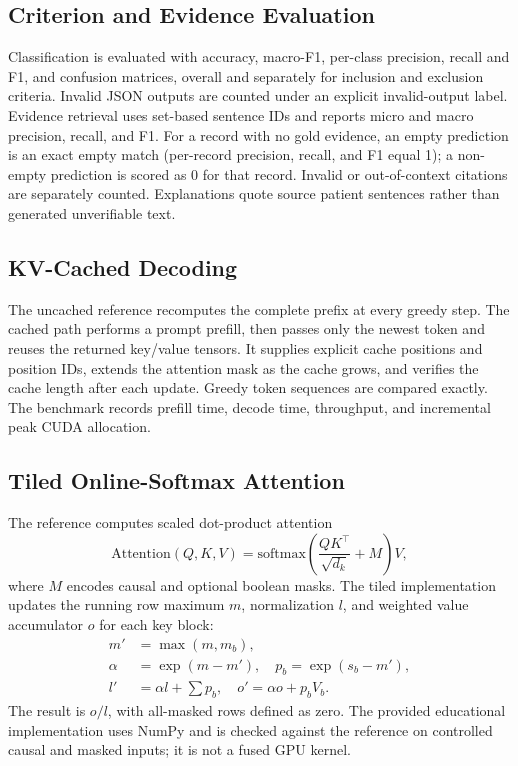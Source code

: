 \documentclass[conference]{IEEEtran}
\begin{document}
\subsection{Criterion and Evidence Evaluation}
Classification is evaluated with accuracy, macro-F1, per-class precision, recall and
F1, and confusion matrices, overall and separately for inclusion and exclusion
criteria. Invalid JSON outputs are counted under an explicit invalid-output label.
Evidence retrieval uses set-based sentence IDs and reports micro and macro precision,
recall, and F1. For a record with no gold evidence, an empty prediction is an exact
empty match (per-record precision, recall, and F1 equal 1); a non-empty prediction is
scored as 0 for that record. Invalid or out-of-context citations are separately
counted. Explanations quote source patient sentences rather than generated
unverifiable text.

\subsection{KV-Cached Decoding}
The uncached reference recomputes the complete prefix at every greedy step. The cached
path performs a prompt prefill, then passes only the newest token and reuses the
returned key/value tensors. It supplies explicit cache positions and position IDs,
extends the attention mask as the cache grows, and verifies the cache length after
each update. Greedy token sequences are compared exactly. The benchmark records
prefill time, decode time, throughput, and incremental peak CUDA allocation.

\subsection{Tiled Online-Softmax Attention}
The reference computes scaled dot-product attention
\begin{equation}
  \mathrm{Attention}(Q,K,V)
  = \mathrm{softmax}\left(\frac{QK^\top}{\sqrt{d_k}} + M\right)V,
\end{equation}
where $M$ encodes causal and optional boolean masks. The tiled implementation updates
the running row maximum $m$, normalization $l$, and weighted value accumulator $o$
for each key block:
\begin{align}
  m' &= \max(m, m_b), \\
  \alpha &= \exp(m-m'), \quad
  p_b = \exp(s_b-m'), \\
  l' &= \alpha l + \sum p_b, \quad
  o' = \alpha o + p_b V_b.
\end{align}
The result is $o/l$, with all-masked rows defined as zero. The provided educational
implementation uses NumPy and is checked against the reference on controlled causal
and masked inputs; it is not a fused GPU kernel.
\end{document}
